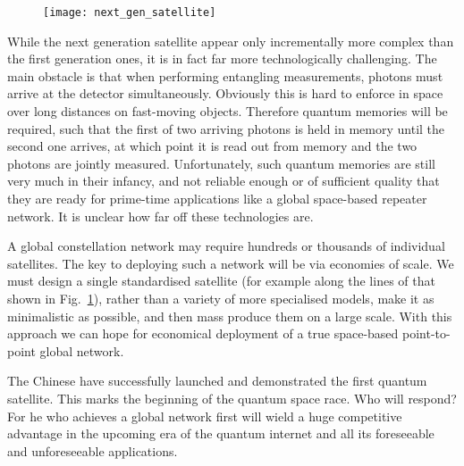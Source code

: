 \begin{figure}[!htb]
\texttt{[image: next\_gen\_satellite]}
\caption{}\label{fig:next_gen_sat}	
\end{figure}

While the next generation satellite appear only incrementally more complex than the first generation ones, it is in fact far more technologically challenging. The main obstacle is that when performing entangling measurements, photons must arrive at the detector simultaneously. Obviously this is hard to enforce in space over long distances on fast-moving objects. Therefore quantum memories will be required, such that the first of two arriving photons is held in memory until the second one arrives, at which point it is read out from memory and the two photons are jointly measured. Unfortunately, such quantum memories are still very much in their infancy, and not reliable enough or of sufficient quality that they are ready for prime-time applications like a global space-based repeater network. It is unclear how far off these technologies are.

A global constellation network may require hundreds or thousands of individual satellites. The key to deploying such a network will be via economies of scale. We must design a single standardised satellite (for example along the lines of that shown in Fig.~\ref{fig:next_gen_sat}), rather than a variety of more specialised models, make it as minimalistic as possible, and then mass produce them on a large scale. With this approach we can hope for economical deployment of a true space-based point-to-point global network.

The Chinese have successfully launched and demonstrated the first quantum satellite. This marks the beginning of the quantum space race. Who will respond? For he who achieves a global network first will wield a huge competitive advantage in the upcoming era of the quantum internet and all its foreseeable and unforeseeable applications.